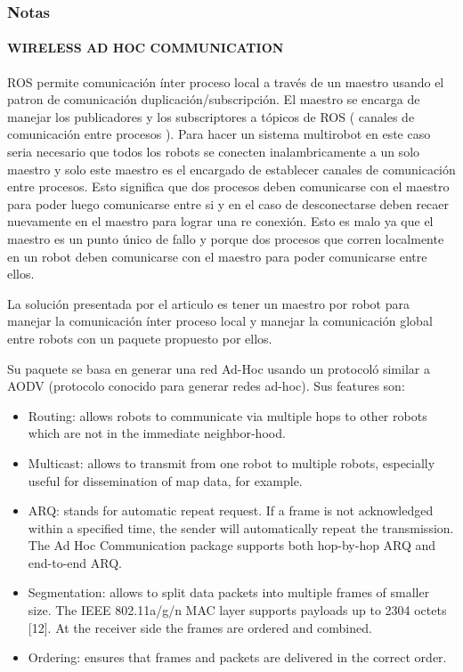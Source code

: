 \subsubsection{Notas}
\paragraph{WIRELESS AD HOC COMMUNICATION}

ROS permite comunicación ínter proceso local a través de un maestro usando el patron de comunicación duplicación/subscripción. El maestro se encarga de manejar los publicadores y los subscriptores a  tópicos de ROS ( canales de comunicación entre procesos ). Para hacer un sistema multirobot en este caso seria necesario que todos los robots se conecten inalambricamente a un solo maestro y solo este maestro es el encargado de establecer canales de comunicación entre procesos. Esto significa que dos procesos deben comunicarse con el maestro para poder luego comunicarse entre si y en el caso de desconectarse deben recaer nuevamente en el maestro para lograr una re conexión. Esto es malo ya que el maestro es un punto único de fallo y porque dos procesos que corren localmente en un robot deben comunicarse con el maestro para poder comunicarse entre ellos.

La solución presentada por el articulo es tener un maestro por robot para manejar la comunicación ínter proceso local y manejar la comunicación global entre robots con un paquete propuesto por ellos. 

Su paquete se basa en generar una red Ad-Hoc usando un protocoló similar a AODV (protocolo conocido para generar redes ad-hoc). Sus features son:
\begin{itemize}
\item Routing: allows robots to communicate via multiple hops to other robots which are not in the immediate neighbor-hood.
\item Multicast: allows to transmit from one robot to multiple robots, especially useful for dissemination of map data, for example.
\item ARQ: stands for automatic repeat request. If a frame is not acknowledged within a specified time, the sender will automatically repeat the transmission. The Ad Hoc Communication package supports both hop-by-hop ARQ and end-to-end ARQ.
\item Segmentation: allows to split data packets into multiple frames of smaller size. The IEEE 802.11a/g/n MAC layer supports payloads up to 2304 octets [12]. At the receiver side the frames are ordered and combined.
\item Ordering: ensures that frames and packets are delivered in the correct order.
\end{itemize}

